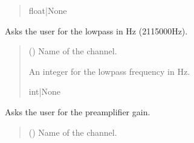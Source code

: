 \documentclass[letterpaper,10pt,english]{sphinxmanual}
\begin{document}
\begin{fulllineitems}
\begin{fulllineitems}
\begin{quote}
\begin{description}
\sphinxAtStartPar
float|None

\end{description}\end{quote}

\end{fulllineitems}


\begin{fulllineitems}
\label{\detokenize{Setup_8401HR:Setup_8401HR.Setup_8401HR._SetLowpass}}
\pysigstartsignatures
{}
\pysigstopsignatures
\sphinxAtStartPar
Asks the user for the low\sphinxhyphen{}pass in Hz (21\sphinxhyphen{}15000Hz).
\begin{quote}\begin{description}
\sphinxAtStartPar
{} () \textendash{} Name of the channel.

\sphinxAtStartPar
An integer for the low\sphinxhyphen{}pass frequency in Hz.

\sphinxAtStartPar
int|None

\end{description}\end{quote}

\end{fulllineitems}


\begin{fulllineitems}
\label{\detokenize{Setup_8401HR:Setup_8401HR.Setup_8401HR._SetPreampGain}}
\pysigstartsignatures
{}
\pysigstopsignatures
\sphinxAtStartPar
Asks the user for the preamplifier gain.
\begin{quote}\begin{description}
\sphinxAtStartPar
{} () \textendash{} Name of the channel.


\end{description}
\end{quote}
\end{fulllineitems}
\end{fulllineitems}
\end{document}
